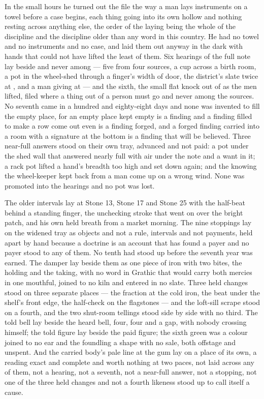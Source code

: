 In the small hours he turned out the file the way a man lays instruments on a towel before a case begins, each thing going into its own hollow and nothing resting across anything else, the order of the laying being the whole of the discipline and the discipline older than any word in this country. He had no towel and no instruments and no case, and laid them out anyway in the dark with hands that could not have lifted the least of them. Six hearings of the full note lay beside and never among --- five from four sources, a cup across a birth room, a pot in the wheel-shed through a finger's width of door, the district's slate twice at , and a man giving at  --- and the sixth, the small flat knock out of  as the men lifted, filed where a thing out of a person must go and never among the sources. No seventh came in a hundred and eighty-eight days and none was invented to fill the empty place, for an empty place kept empty is a finding and a finding filled to make a row come out even is a finding forged, and a forged finding carried into a room with a signature at the bottom is a finding that will be believed. Three near-full answers stood on their own tray, advanced and not paid: a pot under the shed wall that answered nearly full with air under the note and a want in it; a rack pot lifted a hand's breadth too high and set down again; and the knowing the wheel-keeper kept back from a man come up on a wrong wind. None was promoted into the hearings and no pot was lost.

The older intervals lay at Stone 13, Stone 17 and Stone 25 with the half-beat behind a standing finger, the unchecking stroke that went on over the bright patch, and his own held breath from a market morning. The nine stoppings lay on the widened tray as objects and not a rule, intervals and not payments, held apart by hand because a doctrine is an account that has found a payer and no payer stood to any of them. No tenth had stood up before the seventh year was earned. The damper lay beside them as one piece of iron with two bites, the holding and the taking, with no word in Grathic that would carry both mercies in one mouthful, joined to no kiln and entered in no slate. Three held changes stood on three separate places --- the fraction at the cold iron, the beat under the shelf's front edge, the half-check on the flagstones --- and the loft-sill scrape stood on a fourth, and the two shut-room tellings stood side by side with no third. The told bell lay beside the heard bell, four, four and a gap, with nobody crossing himself; the told figure lay beside the paid figure; the sixth green was a colour joined to no ear and the foundling a shape with no sale, both offstage and unspent. And the carried body's pale line at the gum lay on a place of its own, a reading exact and complete and worth nothing at two paces, not laid across any of them, not a hearing, not a seventh, not a near-full answer, not a stopping, not one of the three held changes and not a fourth likeness stood up to call itself a cause.

